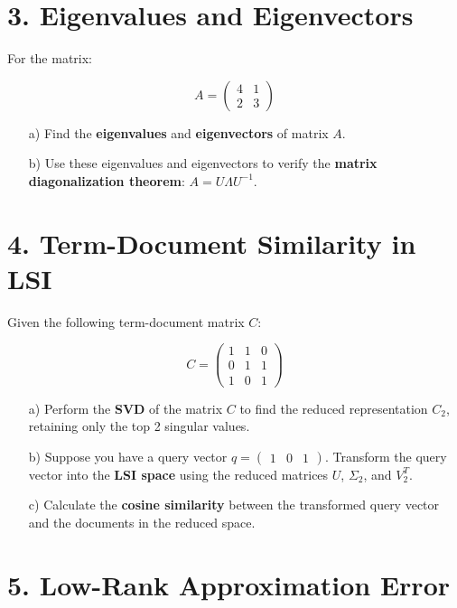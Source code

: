 \documentclass{article}
\begin{document}
\section*{3. Eigenvalues and Eigenvectors}

For the matrix:

\[
A = \begin{pmatrix}
4 & 1 \\
2 & 3
\end{pmatrix}
\]

\begin{enumerate}
    \item[a)] Find the \textbf{eigenvalues} and \textbf{eigenvectors} of matrix \( A \).
    \item[b)] Use these eigenvalues and eigenvectors to verify the \textbf{matrix diagonalization theorem}: \( A = U \Lambda U^{-1} \).
\end{enumerate}

\section*{4. Term-Document Similarity in LSI}

Given the following term-document matrix \( C \):

\[
C = \begin{pmatrix}
1 & 1 & 0 \\
0 & 1 & 1 \\
1 & 0 & 1
\end{pmatrix}
\]

\begin{enumerate}
    \item[a)] Perform the \textbf{SVD} of the matrix \( C \) to find the reduced representation \( C_2 \), retaining only the top 2 singular values.
    \item[b)] Suppose you have a query vector \( q = \begin{pmatrix} 1 & 0 & 1 \end{pmatrix} \). Transform the query vector into the \textbf{LSI space} using the reduced matrices \( U \), \( \Sigma_2 \), and \( V_2^T \).
    \item[c)] Calculate the \textbf{cosine similarity} between the transformed query vector and the documents in the reduced space.
\end{enumerate}

\section*{5. Low-Rank Approximation Error}
\end{document}
